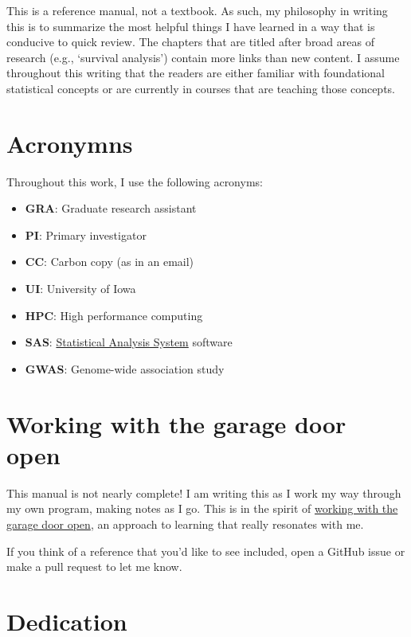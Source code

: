 \documentclass[
]{book}
\providecommand{\tightlist}{%
  \setlength{\itemsep}{0pt}\setlength{\parskip}{0pt}}
\begin{document}
This is a reference manual, not a textbook. As such, my philosophy in writing this is to summarize the most helpful things I have learned in a way that is conducive to quick review. The chapters that are titled after broad areas of research (e.g., `survival analysis') contain more links than new content. I assume throughout this writing that the readers are either familiar with foundational statistical concepts or are currently in courses that are teaching those concepts.

\hypertarget{acronymns}{%
\section{Acronymns}\label{acronymns}}

Throughout this work, I use the following acronyms:

\begin{itemize}
\tightlist
\item
  \textbf{GRA}: Graduate research assistant
\item
  \textbf{PI}: Primary investigator
\item
  \textbf{CC}: Carbon copy (as in an email)
\item
  \textbf{UI}: University of Iowa
\item
  \textbf{HPC}: High performance computing
\item
  \textbf{SAS}: \href{https://en.wikipedia.org/wiki/SAS_(software)}{Statistical Analysis System} software
\item
  \textbf{GWAS}: Genome-wide association study
\end{itemize}

\hypertarget{working-with-the-garage-door-open}{%
\section{Working with the garage door open}\label{working-with-the-garage-door-open}}

This manual is not nearly complete! I am writing this as I work my way through my own program, making notes as I go. This is in the spirit of \href{https://notes.andymatuschak.org/About_these_notes?stackedNotes=z21cgR9K3UcQ5a7yPsj2RUim3oM2TzdBByZu}{working with the garage door open}, an approach to learning that really resonates with me.

If you think of a reference that you'd like to see included, open a GitHub issue or make a pull request to let me know.

\hypertarget{dedication}{%
\section{Dedication}\label{dedication}}
\end{document}
